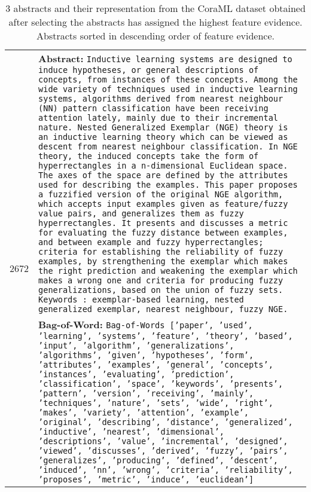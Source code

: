 \begin{table}[!h]
{\begin{tabular}{p{1cm} p{12cm}}
             \multirow{2}{*}{2672}  & \textbf{Abstract:} {\tt Inductive learning systems are designed to induce hypotheses, or general descriptions of concepts, from instances of these concepts. Among the wide variety of techniques used in inductive learning systems, algorithms derived from nearest neighbour (NN) pattern classification have been receiving attention lately, mainly due to their incremental nature. Nested Generalized Exemplar (NGE) theory is an inductive learning theory which can be viewed as descent from nearest neighbour classification. In NGE theory, the induced concepts take the form of hyperrectangles in a n-dimensional Euclidean space. The axes of the space are defined by the attributes used for describing the examples. This paper proposes a fuzzified version of the original NGE algorithm, which accepts input examples given as feature/fuzzy value pairs, and generalizes them as fuzzy hyperrectangles. It presents and discusses a metric for evaluating the fuzzy distance between examples, and between example and fuzzy hyperrectangles; criteria for establishing the reliability of fuzzy examples, by strengthening the exemplar which makes the right prediction and weakening the exemplar which makes a wrong one and criteria for producing fuzzy generalizations, based on the union of fuzzy sets. Keywords : exemplar-based learning, nested generalized exemplar, nearest neighbour, fuzzy NGE.} \\
             & \textbf{Bag-of-Word:} {\tt Bag-of-Words ['paper', 'used', 'learning', 'systems', 'feature', 'theory', 'based', 'input', 'algorithm', 'generalizations', 'algorithms', 'given', 'hypotheses', 'form', 'attributes', 'examples', 'general', 'concepts', 'instances', 'evaluating', 'prediction', 'classification', 'space', 'keywords', 'presents', 'pattern', 'version', 'receiving', 'mainly', 'techniques', 'nature', 'sets', 'wide', 'right', 'makes', 'variety', 'attention', 'example', 'original', 'describing', 'distance', 'generalized', 'inductive', 'nearest', 'dimensional', 'descriptions', 'value', 'incremental', 'designed', 'viewed', 'discusses', 'derived', 'fuzzy', 'pairs', 'generalizes', 'producing', 'defined', 'descent', 'induced', 'nn', 'wrong', 'criteria', 'reliability', 'proposes', 'metric', 'induce', 'euclidean']} \\
             \bottomrule
        \end{tabular}
    }
    \vspace{5mm}
    \caption{3 abstracts and their representation from the CoraML dataset obtained after selecting the abstracts \GPNacro{} has assigned the highest feature evidence. Abstracts sorted in descending order of feature evidence.}
    \label{tab:highest_evidence_abstracts}
\end{table}



